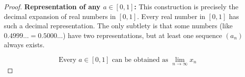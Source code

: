 \documentclass[14pt]{extarticle}
\begin{document}
\begin{enumerate}
\begin{proof}
\medskip
\textbf{Representation of any $a\in[0,1]$:} 
This construction is precisely the decimal expansion of real numbers in $[0,1]$. Every real number in $[0,1]$ has such a decimal representation. The only subtlety is that some numbers (like $0.4999\dots=0.5000\dots$) have two representations, but at least one sequence $(a_n)$ always exists.

\[
\boxed{\text{Every }a\in[0,1]\text{ can be obtained as }\lim_{n\to\infty}x_n}
\]
\end{proof}

\end{enumerate}
\end{document}
